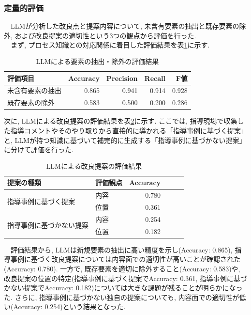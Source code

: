 \subsubsection{定量的評価}
　LLMが分析した改良点と提案内容について, 未含有要素の抽出と既存要素の除外, および改良提案の適切性という3つの観点から評価を行った.\\
　まず, プロセス知識との対応関係に着目した評価結果を表\ref{table_llm_extraction}に示す.

\begin{table}[htbp]
    \centering
    \begin{tabular}{l|rrrr}
        \hline
        評価項目 & Accuracy & Precision & Recall & F値 \\ \hline
        未含有要素の抽出 & 0.865 & 0.941 & 0.914 & 0.928 \\
        既存要素の除外 & 0.583 & 0.500 & 0.200 & 0.286\\
        \hline
    \end{tabular}
    \caption{LLMによる要素の抽出・除外の評価結果}
    \label{table_llm_extraction}
\end{table}

次に, LLMによる改良提案の評価結果を表\ref{table_llm_proposal}に示す. ここでは, 指導現場で収集した指導コメントやそのやり取りから直接的に導かれる「指導事例に基づく提案」と, LLMが持つ知識に基づいて補完的に生成する「指導事例に基づかない提案」に分けて評価を行った.

\begin{table}[htbp]
    \centering
    \begin{tabular}{l|l|rrrr}
        \hline
        提案の種類 & 評価観点 & Accuracy \\ \hline
        \multirow{2}{*}{指導事例に基づく提案} & 内容 & 0.780 \\
        & 位置 & 0.361 \\ \hline
        \multirow{2}{*}{指導事例に基づかない提案} & 内容 & 0.254 \\
        & 位置 & 0.182 \\
        \hline
    \end{tabular}
    \caption{LLMによる改良提案の評価結果}
    \label{table_llm_proposal}
\end{table}

　評価結果から, LLMは新規要素の抽出に高い精度を示し(Accuracy: 0.865), 指導事例に基づく改良提案については内容面での適切性が高いことが確認された(Accuracy: 0.780). 一方で, 既存要素を適切に除外すること(Accuracy: 0.583)や, 改良提案の位置の特定(指導事例に基づく提案でAccuracy: 0.361, 指導事例に基づかない提案でAccuracy: 0.182)については大きな課題が残ることが明らかになった. さらに, 指導事例に基づかない独自の提案についても, 内容面での適切性が低い(Accuracy: 0.254)という結果となった.

